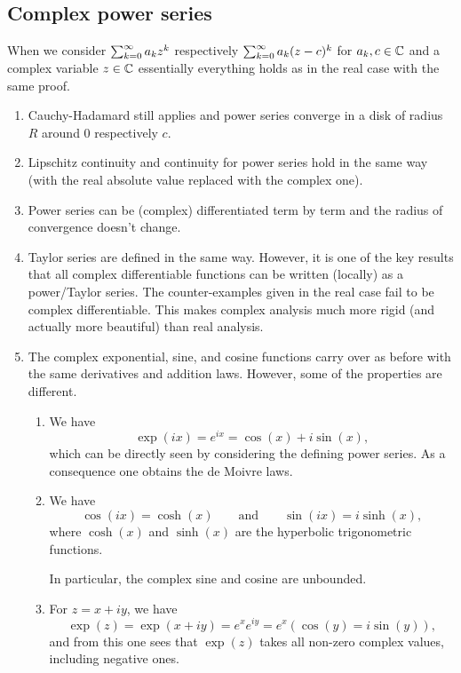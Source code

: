 \documentclass[10pt, a4paper]{article}
\newcommand{\infsumo}{\infsum[k = 0]}
\begin{document}
\subsection{Complex power series}
When we consider $\infsumo a_kz ^ k$ respectively $\infsumo a_k(z - c) ^ k$ for $a_k, c \in \mathbb{C}$ and a complex variable $z \in \mathbb{C}$ essentially everything holds as in the real case with the same proof.
\begin{enumerate}[label = (\roman*)]
    \item Cauchy-Hadamard still applies and power series converge in a disk of radius $R$ around $0$ respectively $c$.

    \item Lipschitz continuity and continuity for power series hold in the same way
    (with the real absolute value replaced with the complex one).

    \item Power series can be
    (complex)
    differentiated term by term and the radius of convergence doesn't change.

    \item Taylor series are defined in the same way.
    However,
    it is one of the key results that all complex differentiable functions can be written
    (locally)
    as a power/Taylor series.
    The counter-examples given in the real case fail to be complex differentiable.
    This makes complex analysis much more rigid
    (and actually more beautiful)
    than real analysis.

    \item
    The complex exponential,
    sine,
    and cosine functions carry over as before with the same derivatives and addition laws.
    However,
    some of the properties are different.
    \begin{enumerate}[label = (\alph*)]
        \item We have
        \[
        \exp(ix) = e ^ {ix} = \cos(x) + i\sin(x),
        \]
        which can be directly seen by considering the defining power series.
        As a consequence one obtains the de Moivre laws.

        \item We have
        \[
        \cos(ix) = \cosh(x)\qquad\text{and}\qquad\sin(ix) = i\sinh(x),
        \]
        where $\cosh(x)$ and $\sinh(x)$ are the hyperbolic trigonometric functions.

        In particular,
        the complex sine and cosine are unbounded.

        \item For $z = x + iy$,
        we have
        \[
        \exp(z) = \exp(x + iy) = e ^ xe ^ {iy} = e ^ x(\cos(y) = i\sin(y)),
        \]
        and from this one sees that $\exp(z)$ takes all non-zero complex values,
        including negative ones.
    \end{enumerate}
\end{enumerate}
\newpage
\end{document}

